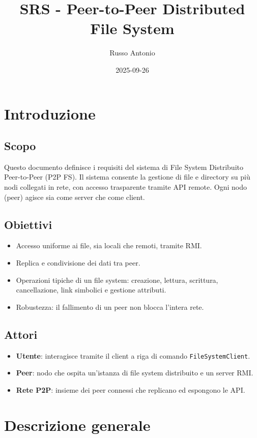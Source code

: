 \documentclass[11pt]{article}
\author{Russo Antonio}
\date{2025-09-26}
\title{SRS - Peer-to-Peer Distributed File System}
\begin{document}
\maketitle
\tableofcontents

\section{Introduzione}
\label{sec:org8b1dca9}
\subsection{Scopo}
\label{sec:org3a2e5ad}
Questo documento definisce i requisiti del sistema di File System
Distribuito Peer-to-Peer (P2P FS). Il sistema consente la gestione di file
e directory su più nodi collegati in rete, con accesso trasparente tramite
API remote. Ogni nodo (peer) agisce sia come server che come client.
\subsection{Obiettivi}
\label{sec:orgc3b33ab}
\begin{itemize}
\item Accesso uniforme ai file, sia locali che remoti, tramite RMI.
\item Replica e condivisione dei dati tra peer.
\item Operazioni tipiche di un file system: creazione, lettura, scrittura,
cancellazione, link simbolici e gestione attributi.
\item Robustezza: il fallimento di un peer non blocca l’intera rete.
\end{itemize}
\subsection{Attori}
\label{sec:orgb4e985f}
\begin{itemize}
\item \textbf{Utente}: interagisce tramite il client a riga di comando
\texttt{FileSystemClient}.
\item \textbf{Peer}: nodo che ospita un’istanza di file system distribuito e un
server RMI.
\item \textbf{Rete P2P}: insieme dei peer connessi che replicano ed espongono le API.
\end{itemize}
\section{Descrizione generale}
\label{sec:orgd67b6ab}
\end{document}
